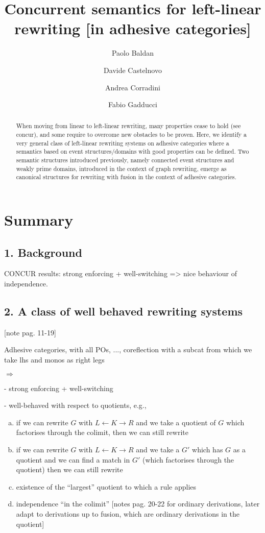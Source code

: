 \documentclass[a4paper,UKenglish,cleveref,pdftex,thm-restate,numberwithinsect]{lipics-v2021}
\author{Paolo Baldan} 
{Department of Mathematics, University of Padua, Italy}
{baldan@math.unipd.it}
{https://orcid.org/0000-0001-9357-5599}{}
\author{Davide Castelnovo}
{Department of Mathematics, University of Padua, Italy}
{davide.castelnovo@math.unipd.it}
{https://orcid.org/0000-0002-5926-5615}{}
\author{Andrea Corradini}
{Department of Computer Science, University of Pisa, Italy}
{andrea.corradini@unipi.it}
{https://orcid.org/0000-0001-6123-4175}{}
\author{Fabio Gadducci}
{Department of Computer Science, University of Pisa, Italy}
{fabio.gadducci@unipi.it}
{https://orcid.org/0000-0003-0690-3051}{}
\title{Concurrent semantics for left-linear rewriting [in adhesive categories]}
\begin{document}
\maketitle


\begin{abstract}
  When moving from linear to left-linear rewriting, many properties
  cease to hold (see concur), and some require to overcome new
  obstacles to be proven. Here, we identify a very general class of
  left-linear rewriting systems on adhesive categories where a
  semantics based on event structures/domains with good properties can
  be defined. Two semantic structures introduced previously, namely
  connected event structures and weakly prime domains, introduced in
  the context of graph rewriting, emerge as canonical structures for
  rewriting with fusion in the context of adhesive categories.
\end{abstract}



\section*{Summary}


\subsection*{1. Background}

CONCUR results: strong enforcing + well-switching => nice behaviour of independence.

\subsection*{2. A class of well behaved rewriting systems}
[note pag. 11-19]

Adhesive categories, with all POs, ...,
coreflection with a subcat from which we take lhs and monos as right legs

$\Rightarrow$

- strong enforcing + well-switching

- well-behaved with respect to quotients, e.g.,

\begin{enumerate}[a.]
\item  if we can rewrite $G$ with $L \leftarrow K \to R$ and we take a quotient
  of $G$ which factorises through the colimit, then we can still rewrite
  
\item if we can rewrite $G$ with $L \leftarrow K \to R$ and we take a $G'$ which
  has $G$ as a quotient and we can find a match in $G'$ (which factorises
  through the quotient) then we can still rewrite
  
  
\item existence of the ``largest'' quotient to which a rule applies
  
  
\item independence ``in the colimit'' [notes pag. 20-22 for ordinary
  derivations, later adapt to derivations up to fusion, which are ordinary
  derivations in the quotient]
\end{enumerate}
\end{document}
